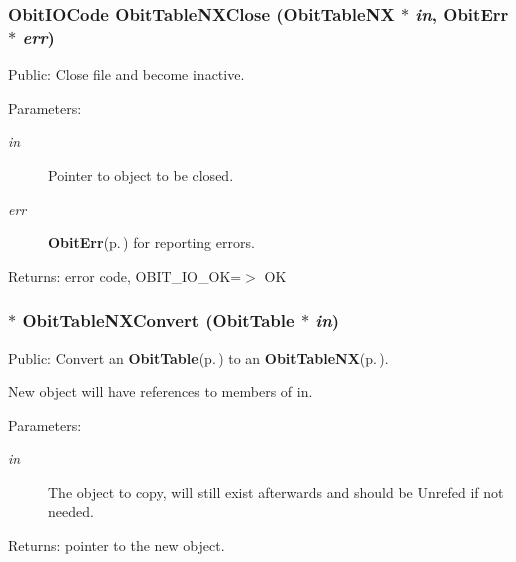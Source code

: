 \subsubsection{\setlength{\rightskip}{0pt plus 5cm}Obit\-IOCode Obit\-Table\-NXClose ({\bf Obit\-Table\-NX} $\ast$ {\em in}, {\bf Obit\-Err} $\ast$ {\em err})}\label{ObitTableNX_8c_a25}


Public: Close file and become inactive. 

\begin{Desc}
\item[Parameters:]
\begin{description}
\item[{\em in}]Pointer to object to be closed. \item[{\em err}]{\bf Obit\-Err}{\rm (p.\,\pageref{structObitErr})} for reporting errors. \end{description}
\end{Desc}
\begin{Desc}
\item[Returns:]error code, OBIT\_\-IO\_\-OK=$>$ OK \end{Desc}
\subsubsection{$\ast$ Obit\-Table\-NXConvert ({\bf Obit\-Table} $\ast$ {\em in})}\label{ObitTableNX_8c_a19}


Public: Convert an {\bf Obit\-Table}{\rm (p.\,\pageref{structObitTable})} to an {\bf Obit\-Table\-NX}{\rm (p.\,\pageref{structObitTableNX})}. 

New object will have references to members of in. \begin{Desc}
\item[Parameters:]
\begin{description}
\item[{\em in}]The object to copy, will still exist afterwards and should be Unrefed if not needed. \end{description}
\end{Desc}
\begin{Desc}
\item[Returns:]pointer to the new object. \end{Desc}
